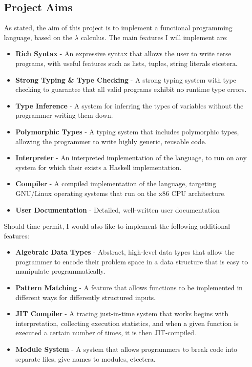 \documentclass{article}
\begin{document}
\subsection{Project Aims} %
As stated, the aim of this project is to implement a functional programming language, based on the $\lambda$ calculus. The main features I will implement are:
\begin{itemize}
    \item \textbf{Rich Syntax} - An expressive syntax that allows the user to write terse programs, with useful features such as lists, tuples, string literals etcetera.
    \item \textbf{Strong Typing \& Type Checking} - A strong typing system with type checking to guarantee that all valid programs exhibit no runtime type errors.
    \item \textbf{Type Inference} - A system for inferring the types of variables without the programmer writing them down.
    \item \textbf{Polymorphic Types} - A typing system that includes polymorphic types, allowing the programmer to write highly generic, reusable code.
    \item \textbf{Interpreter} - An interpreted implementation of the language, to run on any system for which their exists a Haskell implementation.
    \item \textbf{Compiler} - A compiled implementation of the language, targeting GNU/Linux operating systems that run on the x86 CPU architecture.
    \item \textbf{User Documentation} - Detailed, well-written user documentation
\end{itemize}
Should time permit, I would also like to implement the following additional features:
\begin{itemize}
    \item \textbf{Algebraic Data Types} - Abstract, high-level data types that allow the programmer to encode their problem space in a data structure that is easy to manipulate programmatically.
    \item \textbf{Pattern Matching} - A feature that allows functions to be implemented in different ways for differently structured inputs.
    \item \textbf{JIT Compiler} - A tracing just-in-time system that works begins with interpretation, collecting execution statistics, and when a given function is executed a certain number of times, it is then JIT-compiled.
    \item \textbf{Module System} - A system that allows programmers to break code into separate files, give names to modules, etcetera.
\end{itemize}
\end{document}
